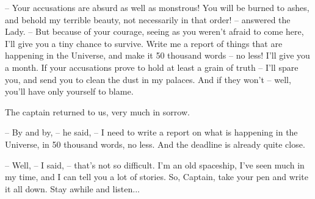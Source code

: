 \documentclass[ebook,oneside,final,openright]{memoir}
\begin{document}
– Your accusations are absurd as well as monstrous! You will be burned to ashes, and behold my terrible beauty, not necessarily in that order! – answered the Lady. – But because of your courage, seeing as you weren’t afraid to come here, I’ll give you a tiny chance to survive. Write me a report of things that are happening in the Universe, and make it 50 thousand words – no less! I’ll give you a month. If your accusations prove to hold at least a grain of truth – I’ll spare you, and send you to clean the dust in my palaces. And if they won’t – well, you’ll have only yourself to blame.\par
\par
The captain returned to us, very much in sorrow.\par
– By and by, – he said, – I need to write a report on what is happening in the Universe, in 50 thousand words, no less. And the deadline is already quite close.\par
– Well, – I said, – that’s not so difficult. I’m an old spaceship, I’ve seen much in my time, and I can tell you a lot of stories. So, Captain, take your pen and write it all down. Stay awhile and listen...
\end{document}
